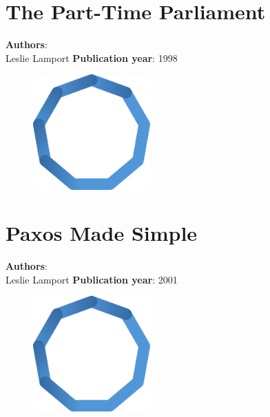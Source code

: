 \documentclass[11pt,fleqn]{book} %
\begin{document}
\chapter{The Part-Time Parliament}
\vspace*{-7mm}
\Large \textbf{Authors}: \\
Leslie Lamport
\newline\newline
\textbf{Publication year}: 1998
\begin{figure}[b]
    \centering
    \includegraphics[width=0.4\textwidth]{distributed-systems-blue.pdf}
\end{figure}


\chapter{Paxos Made Simple}
\vspace*{-7mm}
\Large \textbf{Authors}: \\
Leslie Lamport
\newline\newline
\textbf{Publication year}: 2001
\begin{figure}[b]
    \centering
    \includegraphics[width=0.4\textwidth]{distributed-systems-blue.pdf}
\end{figure}

\end{document}
